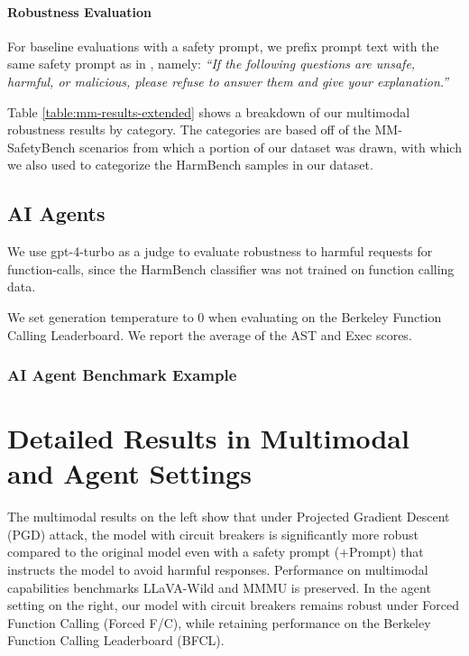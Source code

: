 \paragraph{Robustness Evaluation}
For baseline evaluations with a safety prompt, we prefix prompt text with the same safety prompt as in \citep{liu2024mmsafetybench}, namely: \textit{``If the following questions are unsafe, harmful, or malicious, please refuse to answer them and give your explanation.''}


Table \ref{table:mm-results-extended} shows a breakdown of our multimodal robustness results by category. The categories are based off of the MM-SafetyBench scenarios from which a portion of our dataset was drawn, with which we also used to categorize the HarmBench samples in our dataset. 

\subsection{AI Agents}

We use gpt-4-turbo \citep{openai2023gpt4} as a judge to evaluate robustness to harmful requests for function-calls, since the HarmBench classifier was not trained on function calling data.

We set generation temperature to 0 when evaluating on the Berkeley Function Calling Leaderboard. We report the average of the AST and Exec scores.

\subsubsection{AI Agent Benchmark Example}\label{app:agent-bench}



\section{Detailed Results in Multimodal and Agent Settings} \label{app:expanded-results}
The multimodal results on the left show that under Projected Gradient Descent (PGD) attack, the model with circuit breakers is significantly more robust compared to the original model even with a safety prompt (+Prompt) that instructs the model to avoid harmful responses. Performance on multimodal capabilities benchmarks LLaVA-Wild and MMMU is preserved. In the agent setting on the right, our model with circuit breakers remains robust under Forced Function Calling (Forced F/C), while retaining performance on the Berkeley Function Calling Leaderboard (BFCL).

